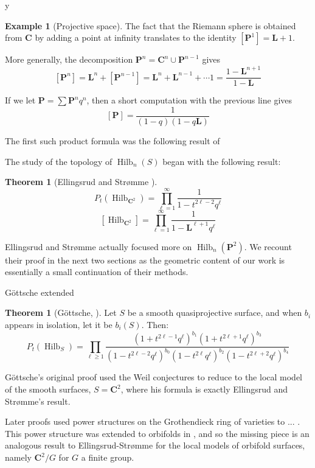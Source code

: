y\documentclass{amsart}[12pt]
\theoremstyle{definition}
\newtheorem{theorem}[dummy]{Theorem}
\newtheorem{example}[dummy]{Example}
\newcommand{\C}{\mathbf{C}}
\newcommand{\LL}{\mathbf{L}}
\newcommand{\proj}{\mathbf{P}}
\DeclareMathOperator{\Hilb}{Hilb}
\newcommand{\HG}{\Hilb}
\begin{document}
\begin{example}[Projective space]
The fact that the Riemann sphere is obtained from $\C$ by adding a point at infinity translates to the identity $[\proj^1]=\LL+1$.

More generally, the decomposition $\proj^n=\C^n\cup \proj^{n-1}$ gives
$$[\proj^n]=\LL^n+[\proj^{n-1}]=\LL^n+\LL^{n-1}+\cdots 1=\frac{1-\LL^{n+1}}{1-\LL}$$


If we let $\proj=\sum \proj^nq^n$, then a short computation with the previous line gives
$$[\proj]=\frac{1}{(1-q)(1-q\LL)}$$
\end{example}


The first such product formula was the following result of 

The study of the topology of $\Hilb_n(S)$ began with the following result:
\begin{theorem}[Ellingsrud and Str\o mme \cite{ES}] 
$$P_t(\HG_{\C^2})=\prod_{\ell=1}^\infty \frac{1}{1-t^{2\ell-2}q^\ell}$$
$$[\HG_{\C^2}]=\prod_{\ell=1}^\infty \frac{1}{1-\LL^{\ell +1}q^\ell}$$
\end{theorem}



Ellingsrud and Str\o mme actually focused more on $\Hilb_n(\proj^2)$.  We recount their proof in the next two sections as the geometric content of our work is essentially a small continuation of their methods.



G\"ottsche extended 

\begin{theorem}[G\"ottsche, \cite{gottsche}]
Let $S$ be a smooth quasiprojective surface, and when $b_i$ appears in isolation, let it be $b_i(S)$.  Then:
$$P_t(\HG_S)=\prod_{\ell\geq 1} \frac{(1+t^{2\ell-1}q^\ell)^{b_1}(1+t^{2\ell+1}q^\ell)^{b_3}}{(1-t^{2\ell-2}q^\ell)^{b_0}(1-t^{2\ell}q^\ell)^{b_2}(1-t^{2\ell+2}q^\ell)^{b_4}}$$
\end{theorem}

G\"ottsche's original proof used the Weil conjectures to reduce to the local model of the smooth surfaces, $S=\C^2$, where his formula is exactly Ellingsrud and Str\o mme's result.

Later proofs used power structures on the Grothendieck ring of varieties to  ...
.  This power structure was extended to orbifolds in \cite{}, and so the missing piece is an analogous result to Ellingsrud-Str\o mme for the local models of orbifold surfaces, namely $\C^2/G$ for $G$ a finite group.  
\end{document}
